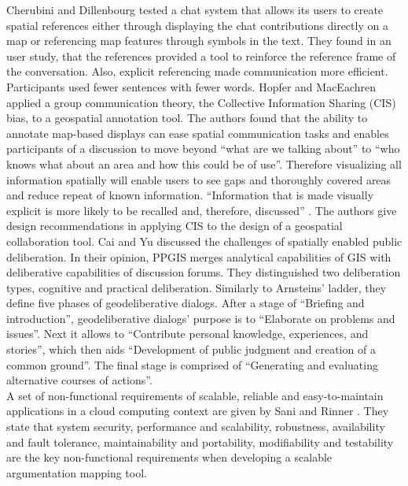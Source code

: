Cherubini and Dillenbourg \cite{Cherubini2007_shared_maps} tested a chat system that allows its users to create spatial references either through displaying the chat contributions directly on a map or referencing map features through symbols in the text. They found in an user study, that the references provided a tool to reinforce the reference frame of the conversation. Also, explicit referencing made communication more efficient. Participants used fewer sentences with fewer words. Hopfer and MacEachren \cite{Hopfer2007_Communication} applied a group communication theory, the Collective Information Sharing (CIS) bias, to a geospatial annotation tool. The authors found that the ability to annotate map-based displays can ease spatial communication tasks and enables participants of a discussion to move beyond ``what are we talking about'' to ``who knows what about an area and how this could be of use''. Therefore visualizing all information spatially will enable users to see gaps and thoroughly covered areas and reduce repeat of known information. ``Information that is made visually explicit is more likely to be recalled and, therefore, discussed'' \cite{Hopfer2007_Communication}. The authors give design recommendations in applying CIS to the design of a geospatial collaboration tool. Cai and Yu \cite{Cai2009_spatial_annotation_deliberation} discussed the challenges of spatially enabled public deliberation. In their opinion, PPGIS merges analytical capabilities of GIS with deliberative capabilities of discussion forums. They distinguished two deliberation types, cognitive and practical deliberation. Similarly to Arnsteins' ladder, they define five phases of geodeliberative dialogs. After a stage of ``Briefing and introduction'', geodeliberative dialogs' purpose is to ``Elaborate on problems and issues''. Next it allows to ``Contribute personal knowledge, experiences, and stories'', which then aids ``Development of public judgment and creation of a common ground''. The final stage is comprised of ``Generating and evaluating alternative courses of actions''.\\
A set of non-functional requirements of scalable, reliable and easy-to-maintain applications in a cloud computing context are given by Sani and Rinner \cite{Sani2011_Scalable_Argumap}. They state that system security, performance and scalability, robustness, availability and fault tolerance, maintainability and portability, modifiability and testability are the key non-functional requirements when developing a scalable argumentation mapping tool.\\
